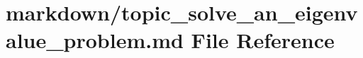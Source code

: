 \hypertarget{topic__solve__an__eigenvalue__problem_8md}{}\section{markdown/topic\+\_\+solve\+\_\+an\+\_\+eigenvalue\+\_\+problem.md File Reference}
\label{topic__solve__an__eigenvalue__problem_8md}

